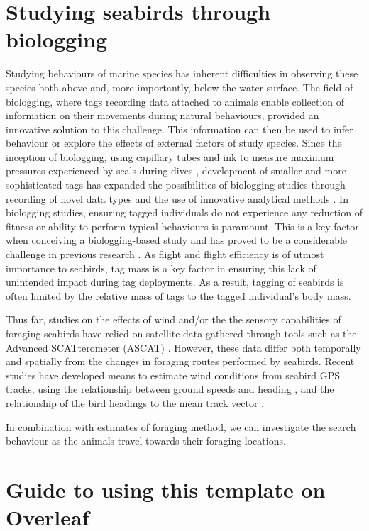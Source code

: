 \documentclass[9pt,twocolumn,twoside,lineno]{pnas-new}
\begin{document}
\section{Studying seabirds through biologging}
Studying behaviours of marine species has inherent difficulties in observing these species both above and, more importantly, below the water surface. The field of biologging, where tags recording data attached to animals enable collection of information on their movements during natural behaviours, provided an innovative solution to this challenge. This information can then be used to infer behaviour or explore the effects of external factors of study species. Since the inception of biologging, using capillary tubes and ink to measure maximum pressures experienced by seals during dives \citep{Kooyman_1965}, development of smaller and more sophisticated tags has expanded the possibilities of biologging studies through recording of novel data types and the use of innovative analytical methods \citep{Kooyman_2004}. In biologging studies, ensuring tagged individuals do not experience any reduction of fitness or ability to perform typical behaviours is paramount. This is a key factor when conceiving a biologging-based study and has proved to be a considerable challenge in previous research \citep{Gessaman_1988, Bowlin_2010}. As flight and flight efficiency is of utmost importance to seabirds, tag mass is a key factor in ensuring this lack of unintended impact during tag deployments. As a result, tagging of seabirds is often limited by the relative mass of tags to the tagged individual's body mass.

Thus far, studies on the effects of wind and/or the the sensory capabilities of foraging seabirds have relied on satellite data gathered through tools such as the Advanced SCATterometer (ASCAT) \citep{Bentamy_2012}. However, these data differ both temporally and spatially from the changes in foraging routes performed by seabirds. Recent studies have developed means to estimate wind conditions from seabird GPS tracks, using the relationship between ground speeds and heading \citep{Yonehara_2016}, and the relationship of the bird headings to the mean track vector \citep{Goto_2017}.

In combination with estimates of foraging method, we can investigate the search behaviour as the animals travel towards their foraging locations.  

\section*{Guide to using this template on Overleaf}
\end{document}
